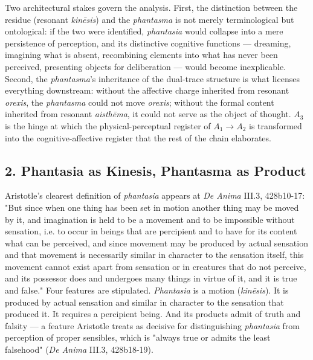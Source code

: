 \documentclass[12pt]{article}
\begin{document}
Two architectural stakes govern the analysis. First, the distinction between the residue (resonant \textit{kinēsis}) and the \textit{phantasma} is not merely terminological but ontological: if the two were identified, \textit{phantasia} would collapse into a mere persistence of perception, and its distinctive cognitive functions --- dreaming, imagining what is absent, recombining elements into what has never been perceived, presenting objects for deliberation --- would become inexplicable. Second, the \textit{phantasma}'s inheritance of the dual-trace structure is what licenses everything downstream: without the affective charge inherited from resonant \textit{orexis}, the \textit{phantasma} could not move \textit{orexis}; without the formal content inherited from resonant \textit{aisthēma}, it could not serve as the object of thought. $A_3$ is the hinge at which the physical-perceptual register of $A_1$$\to$$A_2$ is transformed into the cognitive-affective register that the rest of the chain elaborates.

\subsection*{2. Phantasia as Kinesis, Phantasma as Product}

Aristotle's clearest definition of \textit{phantasia} appears at \textit{De Anima} III.3, 428b10-17: "But since when one thing has been set in motion another thing may be moved by it, and imagination is held to be a movement and to be impossible without sensation, i.e. to occur in beings that are percipient and to have for its content what can be perceived, and since movement may be produced by actual sensation and that movement is necessarily similar in character to the sensation itself, this movement cannot exist apart from sensation or in creatures that do not perceive, and its possessor does and undergoes many things in virtue of it, and it is true and false." Four features are stipulated. \textit{Phantasia} is a motion (\textit{kinēsis}). It is produced by actual sensation and similar in character to the sensation that produced it. It requires a percipient being. And its products admit of truth and falsity --- a feature Aristotle treats as decisive for distinguishing \textit{phantasia} from perception of proper sensibles, which is "always true or admits the least falsehood" (\textit{De Anima} III.3, 428b18-19).
\end{document}
